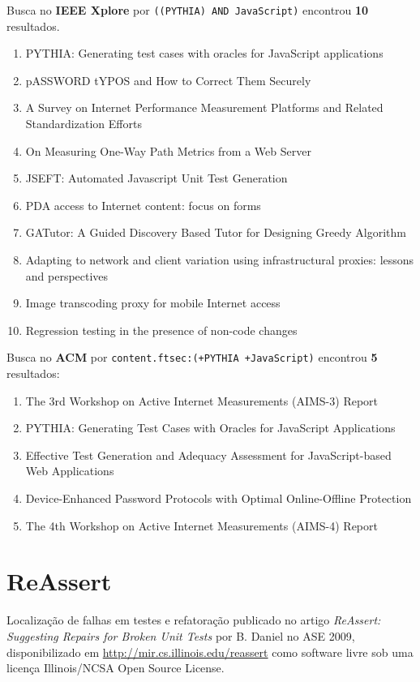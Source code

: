 Busca no {\bf IEEE Xplore} por
\texttt{((PYTHIA) AND JavaScript)}
encontrou {\bf 10}
resultados.

\begin{enumerate}
\item PYTHIA: Generating test cases with oracles for JavaScript applications
\item pASSWORD tYPOS and How to Correct Them Securely
\item A Survey on Internet Performance Measurement Platforms and Related Standardization Efforts
\item On Measuring One-Way Path Metrics from a Web Server
\item JSEFT: Automated Javascript Unit Test Generation
\item PDA access to Internet content: focus on forms
\item GATutor: A Guided Discovery Based Tutor for Designing Greedy Algorithm
\item Adapting to network and client variation using infrastructural proxies: lessons and perspectives
\item Image transcoding proxy for mobile Internet access
\item Regression testing in the presence of non-code changes
\end{enumerate}

Busca no {\bf ACM} por
\texttt{content.ftsec:(+PYTHIA +JavaScript)}
encontrou {\bf 5}
resultados:

\begin{enumerate}
\item The 3rd Workshop on Active Internet Measurements (AIMS-3) Report
\item PYTHIA: Generating Test Cases with Oracles for JavaScript Applications
\item Effective Test Generation and Adequacy Assessment for JavaScript-based Web Applications
\item Device-Enhanced Password Protocols with Optimal Online-Offline Protection
\item The 4th Workshop on Active Internet Measurements (AIMS-4) Report
\end{enumerate}

\section{ReAssert}

Localização de falhas em testes e refatoração
publicado no artigo {\it ReAssert: Suggesting Repairs for Broken Unit Tests}
por B. Daniel
no ASE 2009,
disponibilizado em \url{http://mir.cs.illinois.edu/reassert}
como software livre
sob uma licença Illinois/NCSA Open Source License.

